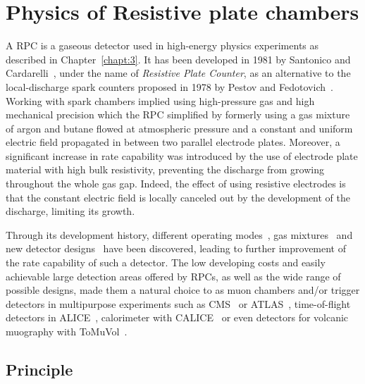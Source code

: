 \renewcommand\evenpagerightmark{{\scshape\small Chapter 4}}
\renewcommand\oddpageleftmark{{\scshape\small Amplification processes in gaseous detectors}}

\renewcommand{\bibname}{References}

\hyphenation{}

\chapter[Physics of Resistive plate chambers]%
{Physics of Resistive plate chambers}
\label{chapt:4}

A \acf{RPC} is a gaseous detector used in high-energy physics experiments as described in Chapter~\ref{chapt:3}. It has been developed in 1981 by Santonico and Cardarelli~\cite{SANTONICO81}, under the name of \textit{Resistive Plate Counter}, as an alternative to the local-discharge spark counters proposed in 1978 by Pestov and Fedotovich~\cite{PESTOV78,FEDOTOVICH82}. Working with spark chambers implied using high-pressure gas and high mechanical precision which the RPC simplified by formerly using a gas mixture of argon and butane flowed at atmospheric pressure and a constant and uniform electric field propagated in between two parallel electrode plates. Moreover, a significant increase in rate capability was introduced by the use of electrode plate material with high bulk resistivity, preventing the discharge from growing throughout the whole gas gap. Indeed, the effect of using resistive electrodes is that the constant electric field is locally canceled out by the development of the discharge, limiting its growth.
	
	Through its development history, different operating modes~\cite{CROTTY93,CROTTY94,CARDARELLI96}, gas mixtures~\cite{SANTONICO81,CARDARELLI93,CARDARELLI96,ABBRESCIA1997PERF,ABBRESCIA1997,CAMARRI98,ZEBALLOS98} and new detector designs~\cite{ZEBALLOS96MRPC,WILLIAMS98,CZYRKOWSKI98} have been discovered, leading to further improvement of the rate capability of such a detector. The low developing costs and easily achievable large detection areas offered by RPCs, as well as the wide range of possible designs, made them a natural choice to as muon chambers and/or trigger detectors in multipurpose experiments such as CMS~\cite{MUONTDR} or ATLAS~\cite{ATLASTDR}, time-of-flight detectors in ALICE~\cite{ALICETDR}, calorimeter with CALICE~\cite{CALICE2016} or even detectors for volcanic muography with ToMuVol~\cite{TOMUVOL2011}. 

\section{Principle}
\label{chapt4:sec:principle}

